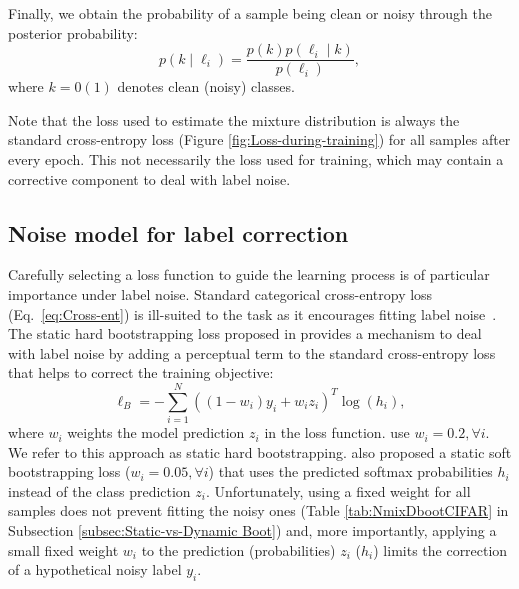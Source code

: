 \documentclass{article}
\begin{document}
Finally, we obtain the probability of a sample being clean or noisy
through the posterior probability: 
\begin{equation}
p\!\left(k\mid\ell_{i}\right)=\frac{p\!\left(k\right)p\!\left(\ell_{i}\mid k\right)}{p\!\left(\ell_{i}\right)},
\end{equation}
where $k=0\left(1\right)$ denotes clean (noisy) classes.

Note that the loss used to estimate the mixture distribution is always the standard cross-entropy loss (Figure \ref{fig:Loss-during-training}) for all samples after every epoch. This not necessarily the loss used for training, which may contain a corrective component to deal with label noise.

\subsection{Noise model for label correction\label{subsec:DynamicBootstrapping}}

Carefully selecting a loss function to guide the learning process is of 
particular importance under label noise. Standard categorical cross-entropy
loss (Eq.~\eqref{eq:Cross-ent}) is ill-suited to the task as it encourages 
fitting label noise~\cite{2017_ICLR_Rethinking}.
The static hard bootstrapping loss proposed in \cite{2015_ICLR_Bootstrapping}
provides a mechanism to deal with label noise by adding a perceptual term to the standard
cross-entropy loss that helps to correct the training
objective: 
\begin{equation}
\ell_{B}=-\sum_{i=1}^{N}\left(\left(1-w_{i}\right)y_{i}+w_{i}z_{i}\right)^T\log\left(\mathit{h_{i}}\right),\label{eq:HardBoot}
\end{equation}
where $w_{i}$ weights the model prediction $z_{i}$ in the loss function.
\cite{2015_ICLR_Bootstrapping} use $w_{i}=0.2,\forall i$.
We refer to this approach as static hard bootstrapping. 
\cite{2015_ICLR_Bootstrapping} also proposed a static soft bootstrapping loss ($w_{i}=0.05,\forall i$)
that uses the predicted softmax probabilities $\mathit{h}_{i}$
instead of the class prediction $z_{i}$. Unfortunately, using a fixed
weight for all samples does not prevent fitting the noisy ones (Table \ref{tab:NmixDbootCIFAR} in Subsection \ref{subsec:Static-vs-Dynamic Boot})
and, more importantly, applying a small fixed weight $w_{i}$ to
the prediction (probabilities) $z_{i}$ ($\mathit{h}_{i}$) limits the correction of a hypothetical noisy label $y_{i}$.
\end{document}
